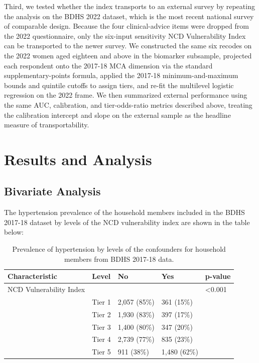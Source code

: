 \documentclass[
  12pt,
  a4paper]{article}
\begin{document}
Third, we tested whether the index transports to an external survey by repeating the analysis on the BDHS 2022 dataset, which is the most recent national survey of comparable design. Because the four clinical-advice items were dropped from the 2022 questionnaire, only the six-input sensitivity NCD Vulnerability Index can be transported to the newer survey. We constructed the same six recodes on the 2022 women aged eighteen and above in the biomarker subsample, projected each respondent onto the 2017-18 MCA dimension via the standard supplementary-points formula, applied the 2017-18 minimum-and-maximum bounds and quintile cutoffs to assign tiers, and re-fit the multilevel logistic regression on the 2022 frame. We then summarized external performance using the same AUC, calibration, and tier-odds-ratio metrics described above, treating the calibration intercept and slope on the external sample as the headline measure of transportability.

\section{Results and Analysis}\label{results-and-analysis}

\subsection{Bivariate Analysis}\label{bivariate-analysis}

The hypertension prevalence of the household members included in the BDHS 2017-18 dataset by levels of the NCD vulnerability index are shown in the table below:

\begin{longtable}[t]{lllll}
\caption{\label{tab:bitab}Prevalence of hypertension by levels of the confounders for household members from BDHS 2017-18 data.}\\
\toprule
Characteristic & Level & No & Yes & p-value\\
\midrule
NCD Vulnerability Index &  &  &  & <0.001\\
 & Tier 1 & 2,057 (85\%) & 361 (15\%) & \\
 & Tier 2 & 1,930 (83\%) & 397 (17\%) & \\
 & Tier 3 & 1,400 (80\%) & 347 (20\%) & \\
 & Tier 4 & 2,739 (77\%) & 835 (23\%) & \\
 & Tier 5 & 911 (38\%) & 1,480 (62\%) & \\
\bottomrule
\end{longtable}
\end{document}
